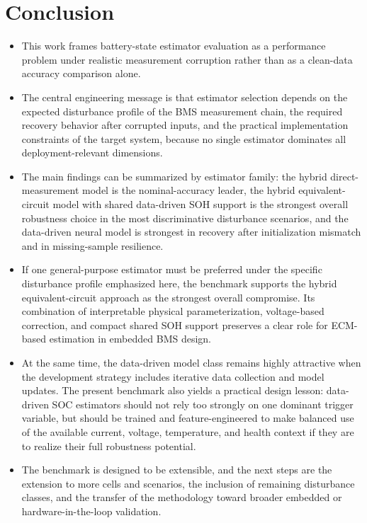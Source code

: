 \documentclass[review,nopreprintline]{elsarticle}
\begin{document}
\section{Conclusion}
\begin{itemize}[leftmargin=*]
    \item This work frames battery-state estimator evaluation as a performance problem under realistic measurement corruption rather than as a clean-data accuracy comparison alone.
    \item The central engineering message is that estimator selection depends on the expected disturbance profile of the BMS measurement chain, the required recovery behavior after corrupted inputs, and the practical implementation constraints of the target system, because no single estimator dominates all deployment-relevant dimensions.
    \item The main findings can be summarized by estimator family: the hybrid direct-measurement model is the nominal-accuracy leader, the hybrid equivalent-circuit model with shared data-driven SOH support is the strongest overall robustness choice in the most discriminative disturbance scenarios, and the data-driven neural model is strongest in recovery after initialization mismatch and in missing-sample resilience.
    \item If one general-purpose estimator must be preferred under the specific disturbance profile emphasized here, the benchmark supports the hybrid equivalent-circuit approach as the strongest overall compromise. Its combination of interpretable physical parameterization, voltage-based correction, and compact shared SOH support preserves a clear role for ECM-based estimation in embedded BMS design.
    \item At the same time, the data-driven model class remains highly attractive when the development strategy includes iterative data collection and model updates. The present benchmark also yields a practical design lesson: data-driven SOC estimators should not rely too strongly on one dominant trigger variable, but should be trained and feature-engineered to make balanced use of the available current, voltage, temperature, and health context if they are to realize their full robustness potential.
    \item The benchmark is designed to be extensible, and the next steps are the extension to more cells and scenarios, the inclusion of remaining disturbance classes, and the transfer of the methodology toward broader embedded or hardware-in-the-loop validation.
\end{itemize}
\end{document}
